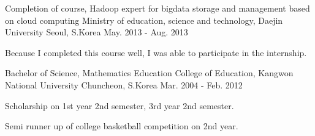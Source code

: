 

\begin{cventries}

  \cventry
    {Completion of course, Hadoop expert for bigdata storage and management based on cloud computing} %
    {Ministry of education, science and technology, Daejin University} %
    {Seoul, S.Korea} %
    {May. 2013 - Aug. 2013} %
    {
      \begin{cvitems} %
        \item {Because I completed this course well, I was able to participate in the internship.}
      \end{cvitems}
    }

  \cventry
    {Bachelor of Science, Mathematics Education} %
    {College of Education, Kangwon National University} %
    {Chuncheon, S.Korea} %
    {Mar. 2004 - Feb. 2012} %
    {
      \begin{cvitems} %
        \item {Scholarship on 1st year 2nd semester, 3rd year 2nd semester.}
        \item {Semi runner up of college basketball competition on 2nd year.}
      \end{cvitems}
    }

\end{cventries}
